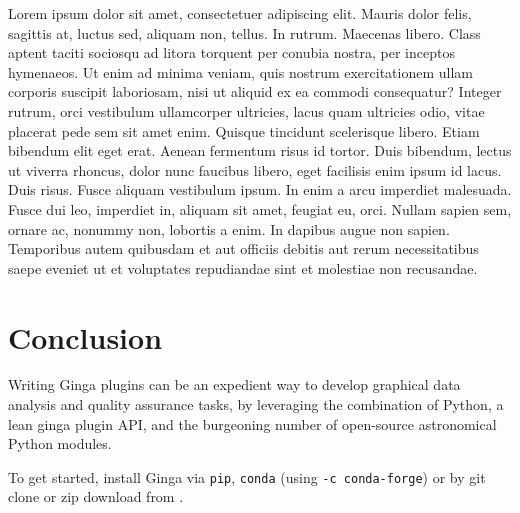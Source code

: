 \documentclass[]{article}
\begin{document}
\begin{multicols}{3}
\para
Lorem ipsum dolor sit amet, consectetuer adipiscing elit. Mauris dolor
felis, sagittis at, luctus sed, aliquam non, tellus. In rutrum. Maecenas
libero. Class aptent taciti sociosqu ad litora torquent per conubia
nostra, per inceptos hymenaeos. Ut enim ad minima veniam, quis nostrum
exercitationem ullam corporis suscipit laboriosam, nisi ut aliquid ex ea
commodi consequatur? Integer rutrum, orci vestibulum ullamcorper
ultricies, lacus quam ultricies odio, vitae placerat pede sem sit amet
enim. Quisque tincidunt scelerisque libero. Etiam bibendum elit eget
erat. Aenean fermentum risus id tortor. Duis bibendum, lectus ut viverra
rhoncus, dolor nunc faucibus libero, eget facilisis enim ipsum id
lacus. Duis risus. Fusce aliquam vestibulum ipsum. In enim a arcu
imperdiet malesuada. Fusce dui leo, imperdiet in, aliquam sit amet,
feugiat eu, orci. Nullam sapien sem, ornare ac, nonummy non, lobortis a
enim. In dapibus augue non sapien. Temporibus autem quibusdam et aut
officiis debitis aut rerum necessitatibus saepe eveniet ut et voluptates
repudiandae sint et molestiae non recusandae.

\section*{Conclusion}

Writing Ginga plugins can be an expedient way to develop graphical data
analysis and quality assurance tasks, by leveraging the combination of
Python, a lean ginga plugin API, and the burgeoning number of open-source
astronomical Python modules.

To get started, install Ginga via {\tt pip},
{\tt conda} (using {\tt -c conda-forge}) or by git clone or zip download
from \cite{ginga}.




\end{multicols}
\end{document}
